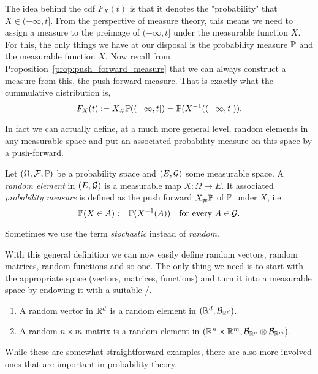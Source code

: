The idea behind the cdf $F_X(t)$ is that it denotes the "probability" that $X \in (-\infty ,t]$. From the perspective of measure theory, this means we need to assign a measure to the preimage of $(-\infty, t]$ under the measurable function $X$. For this, the only things we have at our disposal is the probability measure $\mathbb P$ and the measurable function $X$. Now recall from Proposition~\ref{prop:push_forward_measure} that we can always construct a measure from this, the push-forward measure. That is exactly what the cummulative distribution is,
\[
	F_X(t) := X_\# \mathbb P((-\infty, t]) = \mathbb P(X^{-1}((-\infty,t])).
\]

In fact we can actually define, at a much more general level, random elements in any measurable space and put an associated probability measure on this space by a push-forward.

\begin{definition}
Let $(\Omega,\mathcal F, \mathbb P)$ be a probability space and $(E,\mathcal G)$ some measurable space. A \emph{random element} in $(E,\mathcal G)$ is a measurable map $X : \Omega \to E$. It associated \emph{probability measure} is defined as the push forward $X_\# \mathbb P$ of $\mathbb P$ under $X$, i.e.
\[
	\mathbb P(X \in A) := \mathbb P(X^{-1}(A)) \quad \text{for every } A \in \mathcal G.
\]
\end{definition}

Sometimes we use the term \emph{stochastic} instead of \emph{random}. 

With this general definition we can now easily define random vectors, random matrices, random functions and so one. The only thing we need is to start with the appropriate space (vectors, matrices, functions) and turn it into a measurable space by endowing it with a suitable \sigalg/. 

\begin{example}
\hfill
\begin{enumerate}[label=(\alph*)]
\item A random vector in $\mathbb R^d$ is a random element in $(\mathbb R^d, \mathcal B_{\mathbb R^d})$.
\item A random $n \times m$ matrix is a random element in $(\mathbb R^n \times \mathbb R^m, \mathcal B_{\mathbb R^n} \otimes \mathcal B_{\mathbb R^m})$.
\end{enumerate}
\end{example}

While these are somewhat straightforward examples, there are also more involved ones that are important in probability theory.

